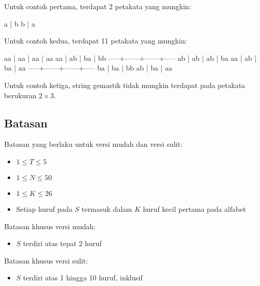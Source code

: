 \documentclass[../main_problemset.tex]{subfiles} %
\begin{document}
Untuk contoh pertama, terdapat 2 petakata yang mungkin:

\begin{lcverbatim}
a  |  b
b  |  a
\end{lcverbatim}

Untuk contoh kedua, terdapat 11 petakata yang mungkin:

\begin{lcverbatim}
 aa  |  aa  |  aa  |  aa
 aa  |  ab  |  ba  |  bb
-----+------+------+-----
 ab  |  ab  |  ab  |  ba
 aa  |  ab  |  ba  |  aa
-----+------+------+-----
 ba  |  ba  |  bb
 ab  |  ba  |  aa
\end{lcverbatim}

Untuk contoh ketiga, string gemastik tidak mungkin terdapat pada petakata berukuran $ 2 \times 3 $.

\subsection*{Batasan}

Batasan yang berlaku untuk versi mudah dan versi sulit:

\begin{itemize}
	\item $ 1 \le T \le 5 $
	\item $ 1 \le N \le 50 $
	\item $ 1 \le K \le 26 $
	\item Setiap huruf pada $ S $ termasuk dalam $ K $ huruf kecil pertama pada alfabet
\end{itemize}

Batasan khusus versi mudah:

\begin{itemize}
	\item $ S $ terdiri atas tepat 2 huruf
\end{itemize}

Batasan khusus versi sulit:

\begin{itemize}
	\item $ S $ terdiri atas 1 hingga 10 huruf, inklusif
\end{itemize}
\end{document}
